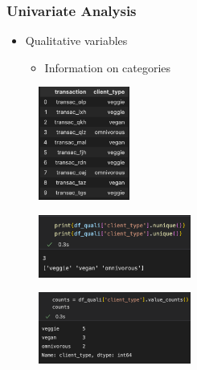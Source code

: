 

\begin{frame}\frametitle{Univariate Analysis}
   \begin{minipage}{0.48\linewidth}
      \begin{itemize}
         \item Qualitative variables
         \begin{itemize}
            \item Information on categories
         \end{itemize}
      \end{itemize}
      \vspace{.5cm}
      \begin{figure}[H]
         \includegraphics[width=3cm]{../images/illustrations/pattern_univariate_qualitative_df.png}
      \end{figure}
   \end{minipage}
   \begin{minipage}{0.48\linewidth}
      \begin{figure}[H]
         \includegraphics[width=5cm]{../images/illustrations/pattern_univariate_qualitative_uniques.png}
      \end{figure}
      \begin{figure}[H]
         \includegraphics[width=5cm]{../images/illustrations/pattern_univariate_qualitative_counts.png}
      \end{figure}
   \end{minipage}
\end{frame}


